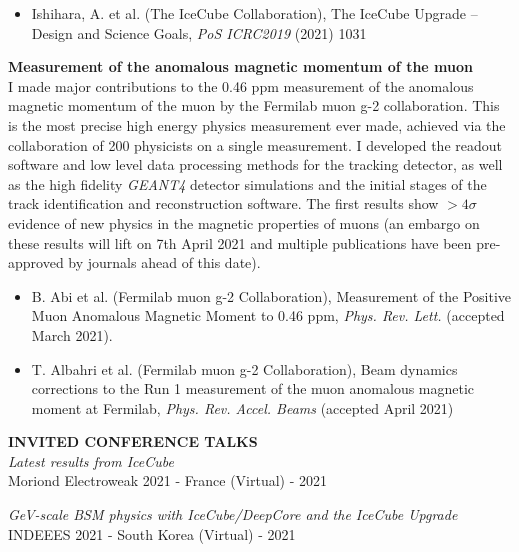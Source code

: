 \documentclass[a4paper,11pt]{article}
\newcounter{bar}
\renewcommand{\smallskip} {\vspace{0.1in}}
\begin{document}
\begin{itemize}
    \item Ishihara, A. et al. (The IceCube Collaboration), The IceCube Upgrade -- Design and Science Goals, \textit{PoS ICRC2019} (2021) 1031
\end{itemize}

\vspace{0.2cm}

{\bf Measurement of the anomalous magnetic momentum of the muon} \\ 
I made major contributions to the 0.46 ppm measurement of the anomalous magnetic momentum of the muon by the Fermilab muon g-2 collaboration. This is the most precise high energy physics measurement ever made, achieved via the collaboration of 200 physicists on a single measurement. I developed the readout software and low level data processing methods for the tracking detector, as well as the high fidelity \textit{GEANT4} detector simulations and the initial stages of the track identification and reconstruction software. The first results show $>4 \sigma$ evidence of new physics in the magnetic properties of muons (an embargo on these results will lift on 7th April 2021 and multiple publications have been pre-approved by journals ahead of this date).

\begin{itemize}
    \item B. Abi et al. (Fermilab muon g-2 Collaboration), Measurement of the Positive Muon Anomalous Magnetic Moment to 0.46 ppm,  \textit{Phys. Rev. Lett.} (accepted March 2021).  
    \item T. Albahri et al. (Fermilab muon g-2 Collaboration), Beam dynamics corrections to the Run 1 measurement of the muon anomalous magnetic moment at Fermilab, \textit{Phys. Rev. Accel. Beams} (accepted April 2021)
\end{itemize}

\vspace{0.5cm}

\textbf{INVITED CONFERENCE TALKS ~~\hrulefill}\smallskip\\
%
{\it Latest results from IceCube} \\ 
 Moriond Electroweak 2021 - France (Virtual) - 2021
 
 {\it GeV-scale BSM physics with IceCube/DeepCore and the IceCube Upgrade} \\ 
 INDEEES 2021 - South Korea (Virtual) - 2021
\end{document}
